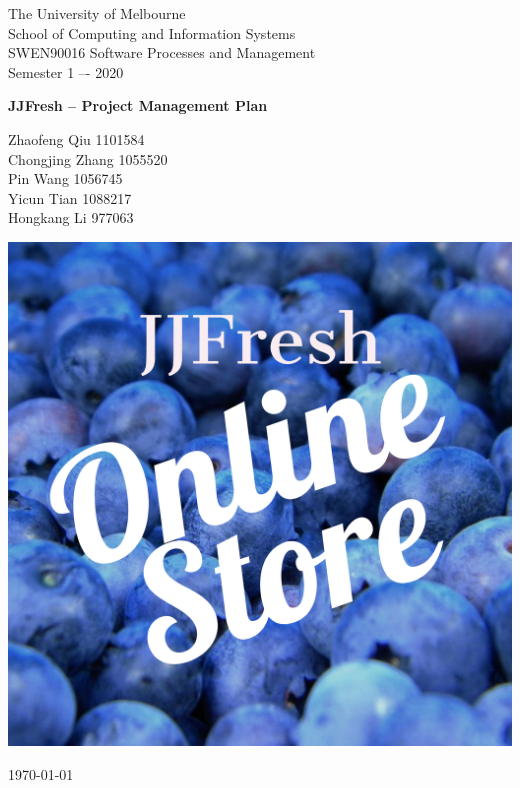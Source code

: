 \documentclass{report}
\begin{document}
\begin{titlepage}
	\clearpage\thispagestyle{empty}
	\centering
	\vspace{1cm}

	{\normalsize The University of Melbourne \\ 
		School of Computing and Information Systems \\
		SWEN90016 Software Processes and Management\\
		Semester 1 –- 2020 \par}
		\vspace{3cm}
	{\Huge \textbf{JJFresh -- Project Management Plan}} \\
	\vspace{4cm}
	{\normalsize Zhaofeng Qiu 1101584\\ %
	             Chongjing Zhang 1055520\\
	             Pin Wang 1056745 \\
	             Yicun Tian 1088217 \\
	             Hongkang Li 977063\par}
	\vspace{3cm}
    
    \centering \includegraphics[scale=0.12]{logo.pdf}
    
    \vspace{0.5cm}
		
	{\normalsize \today \par}
	\pagebreak
\end{titlepage}
\end{document}
